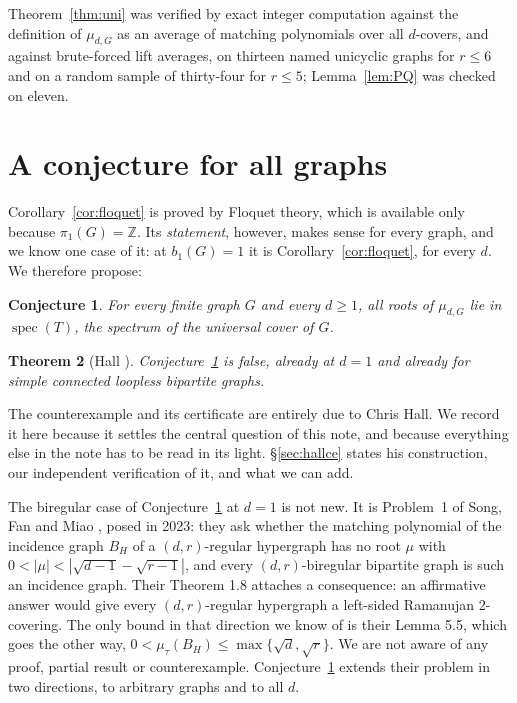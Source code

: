\documentclass[11pt]{article}
\newtheorem{theorem}{Theorem}
\newtheorem{conjecture}[theorem]{Conjecture}
\theoremstyle{remark}
\begin{document}
Theorem~\ref{thm:uni} was verified by exact integer computation against the
definition of $\mu_{d,G}$ as an average of matching polynomials over all
$d$-covers, and against brute-forced lift averages, on thirteen named unicyclic
graphs for $r\le6$ and on a random sample of thirty-four for $r\le5$;
Lemma~\ref{lem:PQ} was checked on eleven.

\section{A conjecture for all graphs}\label{sec:conj}
Corollary~\ref{cor:floquet} is proved by Floquet theory, which is available
only because $\pi_1(G)=\mathbb{Z}$. Its \emph{statement}, however, makes sense
for every graph, and we know one case of it: at $b_1(G)=1$ it is
Corollary~\ref{cor:floquet}, for every $d$. We therefore propose:

\begin{conjecture}\label{conj:gap}
For every finite graph $G$ and every $d\ge1$, all roots of $\mu_{d,G}$ lie in
$\operatorname{spec}(T)$, the spectrum of the universal cover of $G$.
\end{conjecture}

\begin{theorem}[Hall \cite{HallCE}]\label{thm:hallce}
Conjecture~\ref{conj:gap} is false, already at $d=1$ and already for simple connected
loopless bipartite graphs.
\end{theorem}

The counterexample and its certificate are entirely due to Chris Hall. We record it here
because it settles the central question of this note, and because everything else in the
note has to be read in its light. \S\ref{sec:hallce} states his construction, our
independent verification of it, and what we can add.

The biregular case of Conjecture~\ref{conj:gap} at $d=1$ is not new. It is
Problem~1 of Song, Fan and Miao \cite{SFM}, posed in 2023: they ask whether the
matching polynomial of the incidence graph $B_H$ of a $(d,r)$-regular hypergraph
has no root $\mu$ with $0<|\mu|<|\sqrt{d-1}-\sqrt{r-1}|$, and every
$(d,r)$-biregular bipartite graph is such an incidence graph. Their Theorem 1.8
attaches a consequence: an affirmative answer would give every $(d,r)$-regular
hypergraph a left-sided Ramanujan $2$-covering. The only bound in that direction
we know of is their Lemma 5.5, which goes the other way,
$0<\mu_{\tau}(B_H)\le\max\{\sqrt d,\sqrt r\}$. We are not aware of any proof,
partial result or counterexample. Conjecture~\ref{conj:gap} extends their problem
in two directions, to arbitrary graphs and to all $d$.
\end{document}

